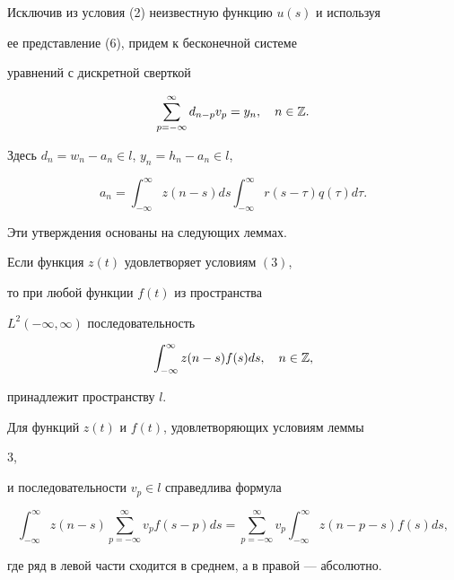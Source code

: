  


Исключив из условия (2) неизвестную функцию $u(s)$ и используя 


ее представление (6), придем к бесконечной системе 


уравнений с дискретной сверткой 


\begin{equation} 


\sum^\infty_{p=-\infty}d_{n-p}v_p=y_n,\quad n\in\Bbb Z. 


\end{equation} 


Здесь $d_n=w_n-a_n\in l$, $y_n=h_n-a_n\in l$,


$$


a_n=\int^\infty_{-\infty}z(n-s)ds 


\int^\infty_{-\infty}r(s-\tau)q(\tau)d\tau.


$$


Эти утверждения основаны на следующих леммах.  


 


\begin{lem} Если функция $z(t)$ удовлетворяет условиям $(3)$,  


то при любой функции $f(t)$ из пространства 


$L^2(-\infty,\infty)$ последовательность 


$$ 


\int^\infty_{-\infty}z(n-s)f(s)ds,\quad n\in\Bbb Z, 


$$ 


принадлежит пространству $l$. 


\end{lem} 


 


\begin{lem} Для функций $z(t)$ и $f(t)$, удовлетворяющих условиям леммы 


$3$, 


и последовательности $v_p\in l$ справедлива формула 


$$ 


\int^\infty_{-\infty}z(n-s)\sum^\infty_{p=-\infty} 


v_p f(s-p)ds=\sum^\infty_{p=-\infty}v_p 


\int^\infty_{-\infty}z(n-p-s)f(s)ds, 


$$ 


где ряд в левой части сходится в среднем, а в правой --- абсолютно. 


\end{lem} 


